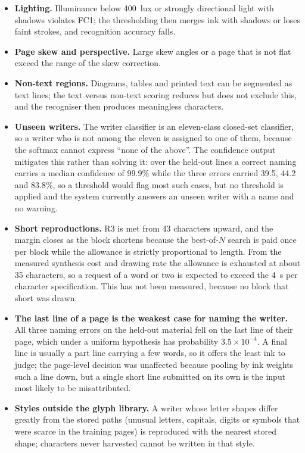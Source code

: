         \begin{itemize}
          \item \textbf{Lighting.} Illuminance below 400~lux or strongly directional light with shadows violates FC1; the thresholding then merges ink with shadows or loses faint strokes, and recognition accuracy falls.
          \item \textbf{Page skew and perspective.} Large skew angles or a page that is not flat exceed the range of the skew correction.
          \item \textbf{Non-text regions.} Diagrams, tables and printed text can be segmented as text lines; the text versus non-text scoring reduces but does not exclude this, and the recogniser then produces meaningless characters.
          \item \textbf{Unseen writers.} The writer classifier is an eleven-class closed-set classifier, so a writer who is not among the eleven is assigned to one of them, because the softmax cannot express ``none of the above''.
          The confidence output mitigates this rather than solving it: over the held-out lines a correct naming carries a median confidence of 99.9\% while the three errors carried 39.5, 44.2 and 83.8\%, so a threshold would flag most such cases, but no threshold is applied and the system currently answers an unseen writer with a name and no warning.
          \item \textbf{Short reproductions.} R3 is met from 43 characters upward, and the margin closes as the block shortens because the best-of-$N$ search is paid once per block while the allowance is strictly proportional to length. From the measured synthesis cost and drawing rate the allowance is exhausted at about 35 characters, so a request of a word or two is expected to exceed the 4~s per character specification. This has not been measured, because no block that short was drawn.
          \item \textbf{The last line of a page is the weakest case for naming the writer.} All three naming errors on the held-out material fell on the last line of their page, which under a uniform hypothesis has probability $3.5\times10^{-4}$. A final line is usually a part line carrying a few words, so it offers the least ink to judge; the page-level decision was unaffected because pooling by ink weights such a line down, but a single short line submitted on its own is the input most likely to be misattributed.
          \item \textbf{Styles outside the glyph library.} A writer whose letter shapes differ greatly from the stored paths (unusual letters, capitals, digits or symbols that were scarce in the training pages) is reproduced with the nearest stored shape; characters never harvested cannot be written in that style.

\end{itemize}
